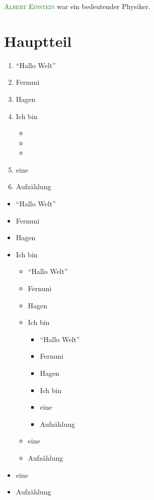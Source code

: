 \documentclass[12pt,ngerman,parskip=full]{scrreprt}
\newcommand{\person}[1]{\textsc{\textcolor{green}{#1}}}
\begin{document}
\person{Albert Einstein} war ein bedeutender Physiker.

\chapter{Hauptteil}\label{cha:hauptteil}

\begin{enumerate}
	\item \enquote{Hallo Welt}
	\item Fernuni
	\item Hagen
	\item Ich bin
	
	\begin{itemize}
		\item 
		\item 
		\item 
	\end{itemize}
	\item eine 
	\item Aufzählung
\end{enumerate}



\blindtext[2]  

\newpage

\begin{itemize}
	\item \enquote{Hallo Welt}
	\item Fernuni
	\item Hagen
	\item Ich bin
	
	\begin{itemize}
	\item \enquote{Hallo Welt}
	\item Fernuni
	\item Hagen
	\item Ich bin
	
	\begin{itemize}
	\item \enquote{Hallo Welt}
	\item Fernuni
	\item Hagen
	\item Ich bin
	\item eine 
	\item Aufzählung
\end{itemize}

	\item eine 
	\item Aufzählung
\end{itemize}
	
	
	\item eine 
	\item Aufzählung
\end{itemize}
\end{document}
